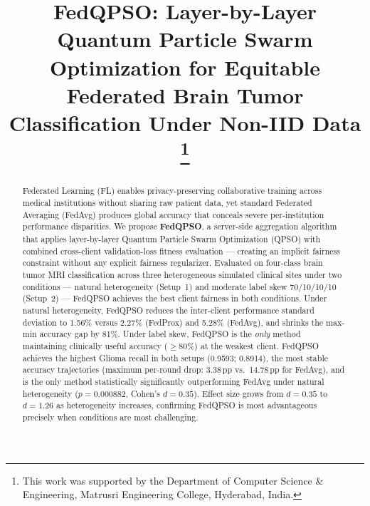 \documentclass[conference]{IEEEtran}
\begin{document}

\title{FedQPSO: Layer-by-Layer Quantum Particle Swarm Optimization for
Equitable Federated Brain Tumor Classification Under Non-IID Data
\thanks{This work was supported by the Department of Computer Science \&
Engineering, Matrusri Engineering College, Hyderabad, India.}}

\author{%
}

\maketitle

\begin{abstract}
Federated Learning (FL) enables privacy-preserving collaborative training
across medical institutions without sharing raw patient data, yet standard
Federated Averaging (FedAvg) produces global accuracy that conceals severe
per-institution performance disparities. We propose \textbf{FedQPSO}, a
server-side aggregation algorithm that applies layer-by-layer Quantum Particle
Swarm Optimization (QPSO) with combined cross-client validation-loss fitness
evaluation — creating an implicit fairness constraint without any explicit
fairness regularizer. Evaluated on four-class brain tumor MRI classification
across three heterogeneous simulated clinical sites under two conditions —
natural heterogeneity (Setup~1) and moderate label skew 70/10/10/10
(Setup~2) — FedQPSO achieves the best client fairness in both conditions.
Under natural heterogeneity, FedQPSO reduces the inter-client performance
standard deviation to 1.56\% versus 2.27\% (FedProx) and 5.28\% (FedAvg),
and shrinks the max-min accuracy gap by 81\%. Under label skew, FedQPSO is
the \emph{only} method maintaining clinically useful accuracy ($\geq$80\%) at
the weakest client. FedQPSO achieves the highest Glioma recall in both setups
(0.9593; 0.8914), the most stable accuracy trajectories (maximum per-round drop:
3.38\,pp vs.\ 14.78\,pp for FedAvg), and is the only method statistically
significantly outperforming FedAvg under natural heterogeneity ($p=0.000882$,
Cohen's $d=0.35$). Effect size grows from $d=0.35$ to $d=1.26$ as
heterogeneity increases, confirming FedQPSO is most advantageous precisely
when conditions are most challenging.
\end{abstract}
\end{document}
